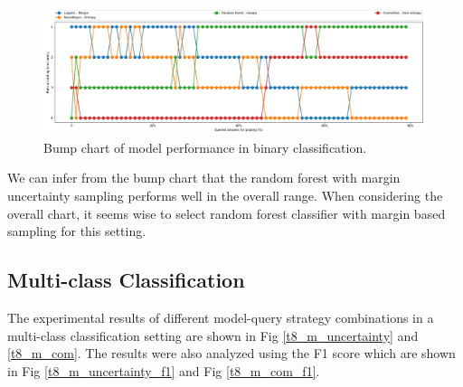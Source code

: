 \begin{figure}[!htb]
	\includegraphics[scale=0.3]{images/binary/task8_rank}
	\caption{Bump chart of model performance in binary classification.}
	\label{t8_b_bump}
\end{figure}


We can infer from the bump chart that the random forest with margin uncertainty sampling performs well in the overall range. When considering the overall chart, it seems wise to select random forest classifier with margin based sampling for this setting. 

%	



\clearpage
\subsection{Multi-class Classification}

The experimental results of different model-query strategy combinations in a multi-class classification setting are shown in Fig \ref{t8_m_uncertainty} and \ref{t8_m_com}. The results were also analyzed using the F1 score which are shown in Fig \ref{t8_m_uncertainty_f1} and Fig \ref{t8_m_com_f1}.

